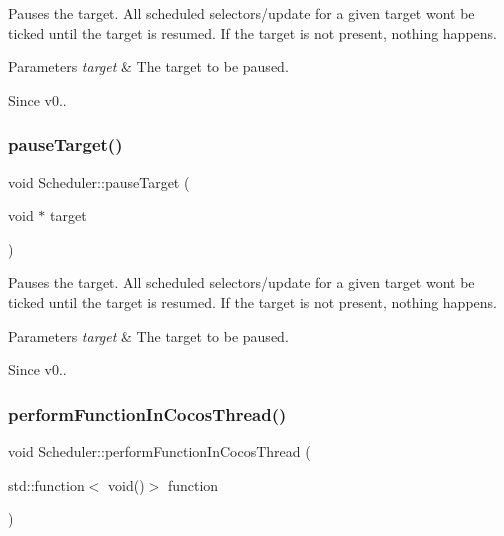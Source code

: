 Pauses the target. All scheduled selectors/update for a given target won\textquotesingle{}t be \textquotesingle{}ticked\textquotesingle{} until the target is resumed. If the target is not present, nothing happens. 
\begin{DoxyParams}{Parameters}
{\em target} & The target to be paused. \\
\hline
\end{DoxyParams}
\begin{DoxySince}{Since}
v0.. 
\end{DoxySince}
\mbox{\label{classScheduler_a409cb6f82cffd7d779154d9d813664af}} 
\subsubsection{\texorpdfstring{pause\+Target()}{pauseTarget()}\hspace{0.1cm}{\footnotesize\ttfamily [2/2]}}
{\footnotesize\ttfamily void Scheduler\+::pause\+Target (\begin{DoxyParamCaption}\item[{void $\ast$}]{target }\end{DoxyParamCaption})}

Pauses the target. All scheduled selectors/update for a given target won\textquotesingle{}t be \textquotesingle{}ticked\textquotesingle{} until the target is resumed. If the target is not present, nothing happens. 
\begin{DoxyParams}{Parameters}
{\em target} & The target to be paused. \\
\hline
\end{DoxyParams}
\begin{DoxySince}{Since}
v0.. 
\end{DoxySince}
\mbox{\label{classScheduler_a24dcb12852832912c43298288c03895f}} 
\subsubsection{\texorpdfstring{perform\+Function\+In\+Cocos\+Thread()}{performFunctionInCocosThread()}\hspace{0.1cm}{\footnotesize\ttfamily [1/2]}}
{\footnotesize\ttfamily void Scheduler\+::perform\+Function\+In\+Cocos\+Thread (\begin{DoxyParamCaption}\item[{std\+::function$<$ void()$>$}]{function }\end{DoxyParamCaption})}

